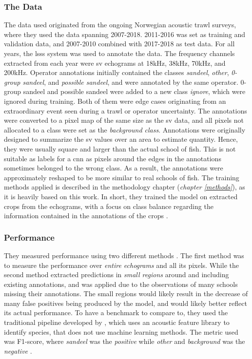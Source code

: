     \subsubsection{The Data}
    The data used originated from the ongoing Norwegian acoustic trawl surveys, where they used the data spanning 2007-2018. 2011-2016 was set as training and validation data, and 2007-2010 combined with 2017-2018 as test data. For all years, the \gls{lsss} system was used to annotate the data. The frequency channels extracted from each year were \gls{sv} echograms at 18kHz, 38kHz, 70kHz, and 200kHz. Operator annotations initially contained the classes \textit{sandeel}, \textit{other}, \textit{0-group sandeel}, and \textit{possible sandeel}, and were annotated by the same operator. 0-group sandeel and possible sandeel were added to a new class \textit{ignore}, which were ignored during training. Both of them were edge cases originating from an extraordinary event seen during a trawl or operator uncertainty. The annotations were converted to a pixel map of the same size as the \gls{sv} data, and all pixels not allocated to a class were set as the \textit{background class}. Annotations were originally designed to summarize the \gls{sv} values over an area to estimate quantity. Hence, they were usually square and larger than the actual school of fish. This is not suitable as labels for a \gls{cnn} as pixels around the edges in the annotations sometimes belonged to the wrong class. As a result, the annotations were approximately reshaped to be more similar to real schools of fish. The training methods applied is described in the methodology chapter (\textit{chapter \ref{methods}}), as it is heavily based on this work.  In short, they trained the model on extracted crops from the echograms, with a focus on class balance regarding the information contained in the annotations of the crops \cite{brautaset2020acoustic}.
    
    \subsubsection{Performance}
    They measured performance using two different methods \cite{brautaset2020acoustic}. The first method was to measure the performance over \textit{entire echograms} and all its pixels. While the second method extracted predictions in \textit{small regions} around and including existing annotations, and was applied due to  the observations of many schools missing their annotations. The small regions would likely result in the decrease of many false positives being produced by the model, and would likely better reflect its actual performance. To have a benchmark to compare to, they used the traditional pipeline developed by \citet{korneliussen2016acoustic}, which uses an acoustic feature library to identify species, that does not use machine learning methods. The metric used was F1-score, where \textit{sandeel} was the \textit{positive}   while \textit{other} and \textit{background} was the \textit{negative} \cite{brautaset2020acoustic}. 
    
